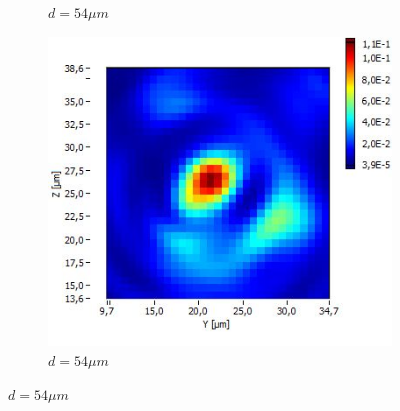 \documentclass[a4paper,11pt]{article}
\begin{document}
\begin{figure}[htb]
\begin{subfigure}[b]{.19\linewidth}
    \caption{$d=54\mu m$}
  \end{subfigure}
  \begin{subfigure}[b]{.19\linewidth}
    \centering
    \includegraphics[width=\textwidth]{Fibre6/scan_012_g1.jpg}
    \caption{$d=54\mu m$}
  \end{subfigure}
\end{figure}
\end{document}
